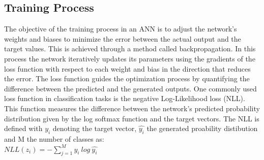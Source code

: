 \documentclass[12pt,fleqn,a4paper]{article}
\begin{document}
\subsection{Training Process} 
The objective of the training process in an ANN is to adjust the network's weights and biases to minimize the error between the actual output and the target values. This is achieved through a method called backpropagation. In this process the network iteratively updates its parameters using the gradients of the loss function with respect to each weight and bias in the direction that reduces the error. The loss function guides the optimization process by quantifying the difference between the predicted and the generated outputs. One commonly used loss function in classification tasks is the negative Log-Likelihood loss (NLL). This function measures the difference between the network's predicted probability distribution given by the log softmax function and the target vectors. The NLL is defined with $y_i$ denoting the target vector, $\hat{y_i}$ the generated proability distibution and M the number of classes as: \\

\vspace{-0.5cm}\hspace{2cm}$ NLL(z_i)=-\sum_{j=1}^{M} y_i ~ log~ \hat{y_i}$
\end{document}
